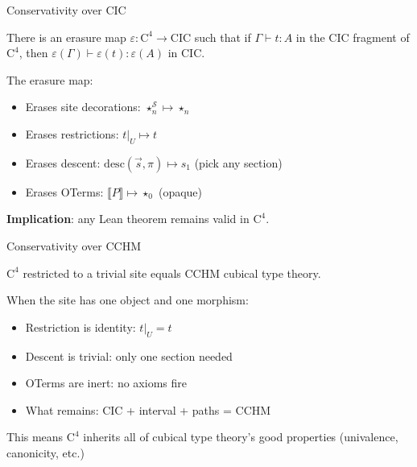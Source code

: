 \documentclass[aspectratio=169,11pt]{beamer}
\newcommand{\Cfour}{\mathrm{C}^4}
\newcommand{\site}{\mathcal{S}}
\newcommand{\den}[1]{\llbracket #1 \rrbracket}
\begin{document}
\begin{frame}{Conservativity over CIC}
\begin{theorem}
There is an erasure map $\varepsilon : \Cfour \to \mathrm{CIC}$ such that if $\Gamma \vdash t : A$ in the CIC fragment of $\Cfour$, then $\varepsilon(\Gamma) \vdash \varepsilon(t) : \varepsilon(A)$ in CIC.
\end{theorem}

\vspace{0.5em}
The erasure map:
\begin{itemize}
\item Erases site decorations: $\star_n^{\site} \mapsto \star_n$
\item Erases restrictions: $t|_U \mapsto t$
\item Erases descent: $\mathrm{desc}(\vec{s}, \pi) \mapsto s_1$ (pick any section)
\item Erases OTerms: $\den{P} \mapsto \star_0$ (opaque)
\end{itemize}

\vspace{0.3em}
\textbf{Implication}: any Lean theorem remains valid in $\Cfour$.
\end{frame}

\begin{frame}{Conservativity over CCHM}
\begin{theorem}
$\Cfour$ restricted to a trivial site equals CCHM cubical type theory.
\end{theorem}

\vspace{0.5em}
When the site has one object and one morphism:
\begin{itemize}
\item Restriction is identity: $t|_U = t$
\item Descent is trivial: only one section needed
\item OTerms are inert: no axioms fire
\item What remains: CIC + interval + paths = CCHM
\end{itemize}

\vspace{0.5em}
This means $\Cfour$ inherits all of cubical type theory's good properties (univalence, canonicity, etc.)
\end{frame}
\end{document}
